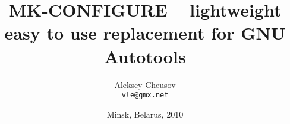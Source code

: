\documentclass[hyperref={colorlinks=true}]{beamer}
\title{MK-CONFIGURE -- lightweight easy to use replacement for GNU Autotools}
\author{Aleksey Cheusov \\ \texttt{vle@gmx.net}}
\date{Minsk, Belarus, 2010}
\begin{document}

\newenvironment{Code}[1]%
               {\Verbatim[label=\bf{#1},frame=single,%
                   fontsize=\small,%
                   commandchars=\\\{\}]}%
               {\endVerbatim}

\newenvironment{CodeNoLabel}%
               {\Verbatim[frame=single,%
                   fontsize=\small,%
                   commandchars=\\\{\}]}%
               {\endVerbatim}

\newenvironment{CodeNoLabelSmallest}%
               {\Verbatim[frame=single,%
                   fontsize=\footnotesize,%
                   commandchars=\\\{\}]}%
               {\endVerbatim}

\newcommand{\prompt}[1]{\bf{#1}\textnormal{}}
\newcommand{\highlight}[1]{\bf{#1}\textnormal{}}
\newcommand{\URL}[1]{\textbf{#1}}
\newcommand{\AutohellFile}[1]{\textcolor{red}{#1}}
\newcommand{\MKCfile}[1]{\textcolor{green}{#1}}
\newcommand{\ModuleName}[1]{\textbf{#1}\textnormal{}}
\newcommand{\ProgName}[1]{\textbf{#1}\textnormal{}}
\newcommand{\ProjectName}[1]{\textbf{#1}\textnormal{}}
\newcommand{\PackageName}[1]{\textbf{#1}\textnormal{}}
\newcommand{\MKC}[1]{\large\textsf{#1}\textnormal{}\normalsize}


\begin{frame}
  \titlepage
\end{frame}
\end{document}
